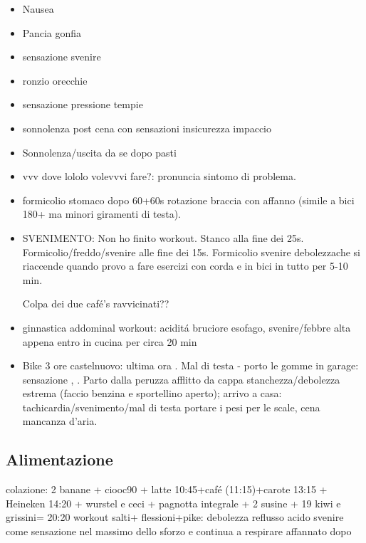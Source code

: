 \begin{itemize}
\item Nausea

\item Pancia gonfia

\item sensazione svenire

\item ronzio orecchie

\item sensazione pressione tempie

\item sonnolenza post cena con sensazioni insicurezza impaccio

\item Sonnolenza/uscita da se dopo pasti

\item vvv dove lololo volevvvi fare?: pronuncia sintomo di problema.

\item formicolio stomaco dopo 60+60s rotazione braccia con affanno (simile a bici 180+ ma minori giramenti di testa).

\item SVENIMENTO: Non ho finito workout. Stanco alla fine dei 25s. Formicolio/freddo/svenire alle fine dei 15s. Formicolio svenire debolezzache si riaccende quando provo a fare esercizi con corda e in bici in tutto per 5-10 min.

Colpa dei due caf\'e's ravvicinati??

\item ginnastica addominal workout: acidit\'a bruciore esofago, svenire/febbre alta appena entro in cucina per circa 20 min

\item Bike 3 ore castelnuovo: ultima ora . Mal di testa - porto le gomme in garage: sensazione , . Parto dalla peruzza afflitto da cappa stanchezza/debolezza estrema (faccio benzina e  sportellino aperto); arrivo a casa: tachicardia/svenimento/mal di testa portare i pesi per le scale, cena mancanza d'aria.

\end{itemize}

\subsection{Alimentazione}

\item colazione: 2 banane + ciooc90 + latte 10:45+caf\'e (11:15)+carote 13:15 + Heineken 14:20 + w\:urstel e ceci + pagnotta integrale + 2 susine  + 19 kiwi e grissini= 20:20 workout salti+
flessioni+pike: debolezza reflusso acido svenire come sensazione nel massimo dello sforzo e continua a respirare affannato dopo


